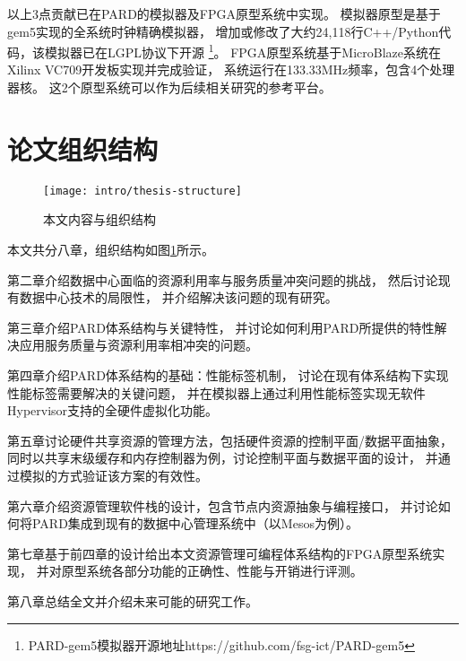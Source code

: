 以上3点贡献已在PARD的模拟器及FPGA原型系统中实现。
模拟器原型是基于gem5\cite{binkert_gem5_2011}实现的全系统时钟精确模拟器，
增加或修改了大约24,118行C++/Python代码，该模拟器已在LGPL协议下开源
\footnote{PARD-gem5模拟器开源地址https://github.com/fsg-ict/PARD-gem5}。
FPGA原型系统基于MicroBlaze系统在Xilinx VC709开发板实现并完成验证，
系统运行在133.33MHz频率，包含4个处理器核。
这2个原型系统可以作为后续相关研究的参考平台。


\section{论文组织结构}

\begin{figure}[htb]
  \centering
  \texttt{[image: intro/thesis-structure]}
  \caption{本文内容与组织结构}
  \label{fig:thesis-structure}
\end{figure}

本文共分八章，组织结构如图\ref{fig:thesis-structure}所示。

第二章介绍数据中心面临的资源利用率与服务质量冲突问题的挑战，
然后讨论现有数据中心技术的局限性，
并介绍解决该问题的现有研究。

第三章介绍PARD体系结构与关键特性，
并讨论如何利用PARD所提供的特性解决应用服务质量与资源利用率相冲突的问题。

第四章介绍PARD体系结构的基础：性能标签机制，
讨论在现有体系结构下实现性能标签需要解决的关键问题，
并在模拟器上通过利用性能标签实现无软件Hypervisor支持的全硬件虚拟化功能。

第五章讨论硬件共享资源的管理方法，包括硬件资源的控制平面/数据平面抽象，
同时以共享末级缓存和内存控制器为例，讨论控制平面与数据平面的设计，
并通过模拟的方式验证该方案的有效性。

第六章介绍资源管理软件栈的设计，包含节点内资源抽象与编程接口，
并讨论如何将PARD集成到现有的数据中心管理系统中（以Mesos\cite{Hindman:2011:Mesos}为例）。

第七章基于前四章的设计给出本文资源管理可编程体系结构的FPGA原型系统实现，
并对原型系统各部分功能的正确性、性能与开销进行评测。

第八章总结全文并介绍未来可能的研究工作。

